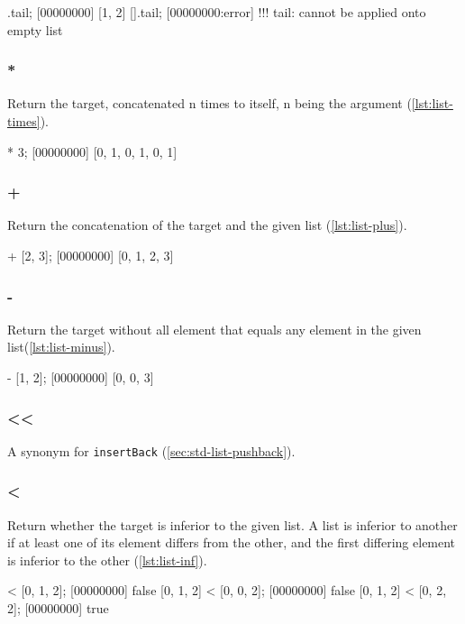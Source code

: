 \begin{urbiscript}[caption=List.tail, label=lst:list-tail]
[0, 1, 2].tail;
[00000000] [1, 2]
[].tail;
[00000000:error] !!! tail: cannot be applied onto empty list
\end{urbiscript}

\subsubsection{*}

Return the target, concatenated n times to itself, n being the
argument (\autoref{lst:list-times}).

\begin{urbiscript}[caption=List.'*', label=lst:list-times]
[0, 1] * 3;
[00000000] [0, 1, 0, 1, 0, 1]
\end{urbiscript}

\subsubsection{+}

Return the concatenation of the target and the given list
(\autoref{lst:list-plus}).

\begin{urbiscript}[caption=List.'+', label=lst:list-plus,
  float=\floatpos]
[0, 1] + [2, 3];
[00000000] [0, 1, 2, 3]
\end{urbiscript}

\subsubsection{-}

Return the target without all element that equals any element in the
given list(\autoref{lst:list-minus}).

\begin{urbiscript}[caption=List.'', label=lst:list-minus,
  float=\floatpos]
[0, 1, 0, 2, 3] - [1, 2];
[00000000] [0, 0, 3]
\end{urbiscript}

\subsubsection{\textless\textless}

A synonym for \lstinline|insertBack| (\autoref{sec:std-list-pushback}).

\subsubsection{\textless}

Return whether the target is inferior to the given list. A list is
inferior to another if at least one of its element differs from the
other, and the first differing element is inferior to the other
(\autoref{lst:list-inf}).

\begin{urbiscript}[caption=List.'', label=lst:list-inf,
  float=\floatpos]
[0, 1, 2] < [0, 1, 2];
[00000000] false
[0, 1, 2] < [0, 0, 2];
[00000000] false
[0, 1, 2] < [0, 2, 2];
[00000000] true
\end{urbiscript}
